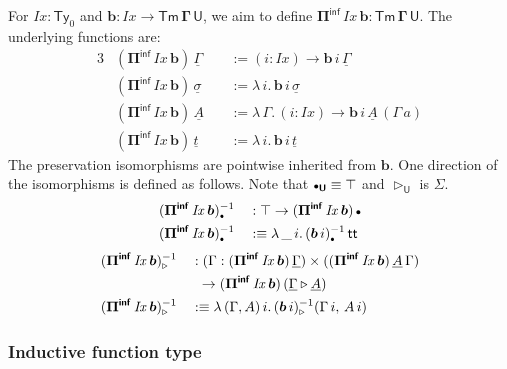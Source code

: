 \documentclass[12pt,a4paper,twoside,openany]{book}
\theoremstyle{remark}
\theoremstyle{definition}
\theoremstyle{theorem}
\newcommand{\mi}[1]{\mathit{#1}}
\newcommand{\bs}[1]{\boldsymbol{#1}}
\newcommand{\Tm}{\mathsf{Tm}}
\newcommand{\Ty}{\mathsf{Ty}}
\newcommand{\U}{\mathsf{U}}
\renewcommand{\tt}{\mathsf{tt}}
\newcommand{\ra}{\rightarrow}
\newcommand{\ext}{\triangleright}
\newcommand{\emptycon}{\scaleobj{.75}\bullet}
\newcommand{\Piinf}{\Pi^{\mathsf{inf}}}
\newcommand{\bTm}{\bs{\Tm}}
\newcommand{\bGamma}{\bs{\Gamma}}
\newcommand{\bb}{\bs{b}}
\newcommand{\bU}{\bs{\U}}
\newcommand{\bPiinf}{\bs{\Piinf}}
\newcommand{\ul}[1]{\underline{#1}}
\newcommand{\ulGamma}{\ul{\Gamma}}
\newcommand{\ulsigma}{\ul{\sigma}}
\newcommand{\ult}{\ul{t}}
\newcommand{\ulA}{\ul{A}}
\newcommand{\defn}{:\equiv}
\begin{document}
For $\mi{Ix} : \Ty_0$ and $\bb : \mi{Ix} \ra \bTm\,\bGamma\,\bU$, we aim to define
$\bPiinf\,\mi{Ix}\,\bb \bs{:} \bTm\,\bGamma\,\bU$. The underlying functions
are:
\begin{alignat*}{3}
  & (\bPiinf\,\mi{Ix}\,\bb)\,\ulGamma    &&:= (i : \mi{Ix})\ra \bb\,i\,\ulGamma\\
  & (\bPiinf\,\mi{Ix}\,\bb)\,\ulsigma    &&:= \lambda\,i.\, \bb\,i\,\ulsigma\\
  & (\bPiinf\,\mi{Ix}\,\bb)\,\ulA\       &&:= \lambda\,\Gamma.\,(i : \mi{Ix})\ra \bb\,i\,\ulA\,(\Gamma\, a)\\
  & (\bPiinf\,\mi{Ix}\,\bb)\,\ult        &&:= \lambda\,i.\, \bb\,i\,\ult
\end{alignat*}
The preservation isomorphisms are pointwise inherited from $\bb$. One direction
of the isomorphisms is defined as follows. Note that $\emptycon_{\bU} \equiv
\top$ and $\ext_{\bU}$ is $\Sigma$.
\begin{alignat*}{3}
  &(\bPiinf\,\mi{Ix}\,\bb)_{\emptycon}^{-1} && : \top\ra (\bPiinf\,\mi{Ix}\,\bb)\,\emptycon\\
  &(\bPiinf\,\mi{Ix}\,\bb)_{\emptycon}^{-1} && \defn \lambda\,\_\,i.\,(\bb\,i)_{\emptycon}^{-1}\,\tt
\end{alignat*}
\begin{alignat*}{3}
  &(\bPiinf\,\mi{Ix}\,\bb)_{\ext}^{-1} && : (\Gamma : (\bPiinf\,\mi{Ix}\,\bb)\,\ulGamma)\times((\bPiinf\,\mi{Ix}\,\bb)\,\ulA\,\Gamma)\\
  & && \hspace{0.5em}\ra (\bPiinf\,\mi{Ix}\,\bb)\,(\ulGamma \ext \ulA)\\
  & (\bPiinf\,\mi{Ix}\,\bb)_{\ext}^{-1} && \defn \lambda\,(\Gamma,A)\,i.\,(\bb\,i)_{\ext}^{-1}(\Gamma\,i,\,A\,i)
\end{alignat*}

\subsubsection{Inductive function type}
\end{document}
